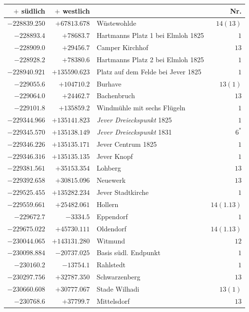 \begin{center}\begingroup\fontsize{8}{9}\selectfont
\setlength{\tabcolsep}{4pt}
\begin{tabular}{r|r|p{170pt}|r}\hline
\(+\) südlich&\(+\) westlich&&Nr.\\\hline
\(-228839.250\)&\(+67813.678\)&Wüstewohlde&\(14(13)\)\\
\(-228893.4\)&\(+78683.7\)&Hartmanns Platz 1 bei Elmloh 1825&\(1\)\\
\(-228909.0\)&\(+29456.7\)&Camper Kirchhof&\(13\)\\
\(-228928.2\)&\(+78380.6\)&Hartmanns Platz 2 bei Elmloh 1825&\(1\)\\
\(-228940.921\)&\(+135590.623\)&Platz auf dem Felde bei Jever 1825&\(1\)\\
\(-229055.6\)&\(+104710.2\)&Burhave&\(13(1)\)\\
\(-229064.0\)&\(+24462.7\)&Bachenbruch&\(13\)\\
\(-229101.8\)&\(+135859.2\)&Windmühle mit sechs Flügeln&\(1\)\\
\(-229344.966\)&\(+135141.823\)&\textit{Jever Dreieckspunkt} 1825&\(1\)\\
\(-229345.570\)&\(+135138.149\)&\textit{Jever Dreieckspunkt} 1831&\(6^{*}\)\\
\(-229346.226\)&\(+135135.171\)&Jever Centrum 1825&\(1\)\\
\(-229346.316\)&\(+135135.135\)&Jever Knopf&\(1\)\\
\(-229381.561\)&\(+35153.354\)&Lohberg&\(13\)\\
\(-229392.658\)&\(+30815.096\)&Neuewerk&\(13\)\\
\(-229525.455\)&\(+135282.234\)&Jever Stadtkirche&\(1\)\\
\(-229559.661\)&\(+25482.061\)&Hollern&\(14(1.13)\)\\
\(-229672.7\)&\(-3334.5\)&Eppendorf&\(1\)\\
\(-229675.022\)&\(+45730.111\)&Oldendorf&\(14(1.13)\)\\
\(-230044.065\)&\(+143131.280\)&Witmund&\(12\)\\
\(-230098.884\)&\(-20737.025\)&Basis südl. Endpunkt&\(1\)\\
\(-230160.2\)&\(-13754.1\)&Rahlstedt&\(1\)\\
\(-230297.756\)&\(+32787.350\)&Schwarzenberg&\(13\)\\
\(-230660.608\)&\(+30777.067\)&Stade Wilhadi&\(13(1)\)\\
\(-230768.6\)&\(+37799.7\)&Mittelsdorf&\(13\)\\

\end{tabular}
\end{center}
